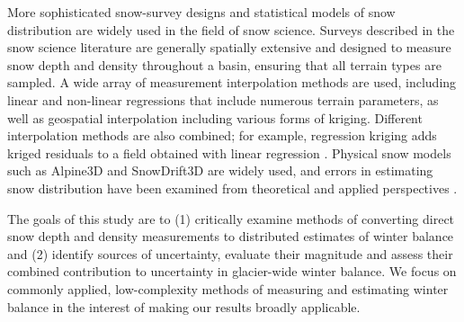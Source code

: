 \documentclass[review,oneside, letterpaper]{igs}
\begin{document}
More sophisticated snow-survey designs and statistical models of snow distribution are widely used in the field of snow science. Surveys described in the snow science literature are generally spatially extensive and designed to measure snow depth and density throughout a basin, ensuring that all terrain types are sampled. A wide array of measurement interpolation methods are used, including linear \citep[e.g.][]{Lopez2010} and non-linear regressions \citep[e.g.][]{Molotch2005} that include numerous terrain parameters, as well as geospatial interpolation \citep[e.g.][]{Erxleben2002} including various forms of  kriging. Different interpolation methods are also combined; for example, regression kriging adds kriged residuals to a field obtained with linear regression \citep[e.g.][]{Balk2000}. Physical snow models such as Alpine3D \citep{Lehning2006} and SnowDrift3D \citep{Schneiderbauer2011} are widely used, and errors in estimating snow distribution have been examined from theoretical \citep[e.g.][]{Trujillo2015} and applied perspectives \citep[e.g.][]{Turcan1975,Woo1978, Deems2006}. 

The goals of this study are to (1) critically examine methods of converting direct snow depth and density measurements to distributed estimates of winter balance and (2) identify sources of uncertainty, evaluate their magnitude and assess their combined contribution to uncertainty in glacier-wide winter balance. We focus on commonly applied, low-complexity methods of measuring and estimating winter balance in the interest of making our results broadly applicable.
\end{document}
